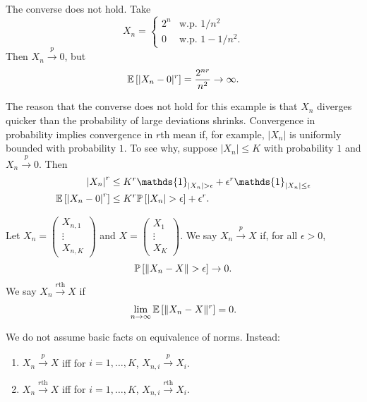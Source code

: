 \begin{remark}	\label{1-13-1}
	The converse does not hold. Take
	\[
		X_n =
		\begin{cases}
			2^n & \text{w.p. }1/n^2    \\
			0   & \text{w.p. }1-1/n^2.
		\end{cases}
	\]
	Then $X_n\xrightarrow{p}0$, but
	\[
		\mathbb{E}\left[|X_n-0|^r\right]=\frac{2^{nr}}{n^2}\to\infty.
	\]

	The reason that the converse does not hold for this example is that $X_n$ diverges quicker than the probability of large deviations shrinks. Convergence in probability implies convergence in $r$th mean if, for example, $\left| X_n \right|$ is uniformly bounded with probability $1$. To see why, suppose $\left| X_n \right|\le K$ with probability $1$ and $X_n \xrightarrow{p} 0$. Then
	\begin{align*}
		\left| X_n \right|^{r}                    & \le K^{r} \mathds{1}_{\left| X_n \right| > \epsilon} + \epsilon^{r} \mathds{1}_{\left| X_n \right| \le \epsilon} \\
		\E\left[\left| X_n - 0 \right|^{r}\right] & \le K^{r} \P\left[\left| X_n \right| > \epsilon\right] + \epsilon^{r}
		.\end{align*}
\end{remark}

\begin{definition}
	Let $X_n=\begin{pmatrix}X_{n,1}\\ \vdots\\ X_{n,K}\end{pmatrix}$ and $X=\begin{pmatrix}X_1\\ \vdots\\ X_K\end{pmatrix}$. We say $X_n\xrightarrow{p}X$ if, for all $\epsilon>0$,
	\[
		\P\left[\|X_n-X\|>\epsilon\right]\to 0.
	\]
	We say $X_n\xrightarrow{r\text{th}}X$ if
	\[
		\lim_{n\to\infty}\mathbb{E}\left[\|X_n-X\|^r\right]=0.
	\]
\end{definition}

\begin{proposition}	We do not assume basic facts on equivalence of norms. Instead:
	\begin{enumerate}[label=(\roman*)]
		\item  $X_n \xrightarrow{p} X$ iff for $i=1,\dots,K$, $X_{n,i}\xrightarrow{p}X_i$.
		\item $X_n \xrightarrow{r\text{th}} X$ iff for $i = 1,\ldots,K$, $X_{n,i} \xrightarrow{r\text{th}} X_i$.
	\end{enumerate}
\end{proposition}

